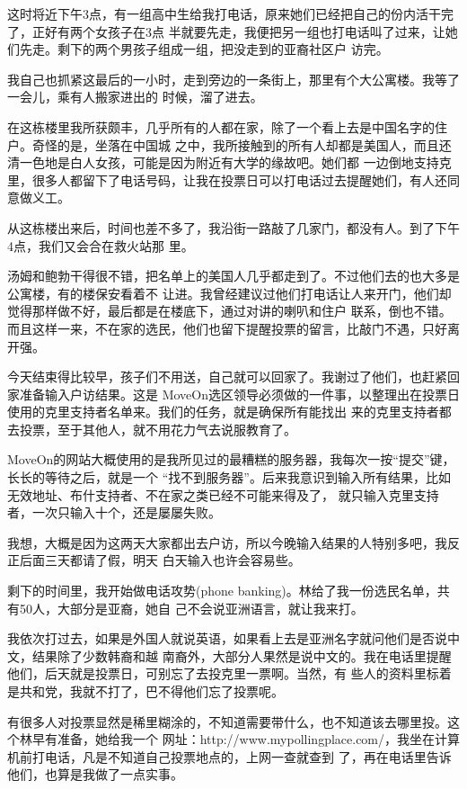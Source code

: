 ﻿\documentclass[11pt]{article}
\begin{document}
这时将近下午3点，有一组高中生给我打电话，原来她们已经把自己的份内活干完了，正好有两个女孩子在3点
半就要先走，我便把另一组也打电话叫了过来，让她们先走。剩下的两个男孩子组成一组，把没走到的亚裔社区户
访完。

我自己也抓紧这最后的一小时，走到旁边的一条街上，那里有个大公寓楼。我等了一会儿，乘有人搬家进出的
时候，溜了进去。

在这栋楼里我所获颇丰，几乎所有的人都在家，除了一个看上去是中国名字的住户。奇怪的是，坐落在中国城
之中，我所接触到的所有人却都是美国人，而且还清一色地是白人女孩，可能是因为附近有大学的缘故吧。她们都
一边倒地支持克里，很多人都留下了电话号码，让我在投票日可以打电话过去提醒她们，有人还同意做义工。

从这栋楼出来后，时间也差不多了，我沿街一路敲了几家门，都没有人。到了下午4点，我们又会合在救火站那
里。

汤姆和鲍勃干得很不错，把名单上的美国人几乎都走到了。不过他们去的也大多是公寓楼，有的楼保安看着不
让进。我曾经建议过他们打电话让人来开门，他们却觉得那样做不好，最后都是在楼底下，通过对讲的喇叭和住户
联系，倒也不错。而且这样一来，不在家的选民，他们也留下提醒投票的留言，比敲门不遇，只好离开强。

今天结束得比较早，孩子们不用送，自己就可以回家了。我谢过了他们，也赶紧回家准备输入户访结果。这是
MoveOn选区领导必须做的一件事，以整理出在投票日使用的克里支持者名单来。我们的任务，就是确保所有能找出
来的克里支持者都去投票，至于其他人，就不用花力气去说服教育了。

MoveOn的网站大概使用的是我所见过的最糟糕的服务器，我每次一按``提交''键，长长的等待之后，就是一个
``找不到服务器''。后来我意识到输入所有结果，比如无效地址、布什支持者、不在家之类已经不可能来得及了，
就只输入克里支持者，一次只输入十个，还是屡屡失败。

我想，大概是因为这两天大家都出去户访，所以今晚输入结果的人特别多吧，我反正后面三天都请了假，明天
白天输入也许会容易些。

剩下的时间里，我开始做电话攻势(phone banking)。林给了我一份选民名单，共有50人，大部分是亚裔，她自
己不会说亚洲语言，就让我来打。


我依次打过去，如果是外国人就说英语，如果看上去是亚洲名字就问他们是否说中文，结果除了少数韩裔和越
南裔外，大部分人果然是说中文的。我在电话里提醒他们，后天就是投票日，可别忘了去投克里一票啊。当然，有
些人的资料里标着是共和党，我就不打了，巴不得他们忘了投票呢。

有很多人对投票显然是稀里糊涂的，不知道需要带什么，也不知道该去哪里投。这个林早有准备，她给我一个
网址：http://www.mypollingplace.com/，我坐在计算机前打电话，凡是不知道自己投票地点的，上网一查就查到
了，再在电话里告诉他们，也算是我做了一点实事。
\end{document}
